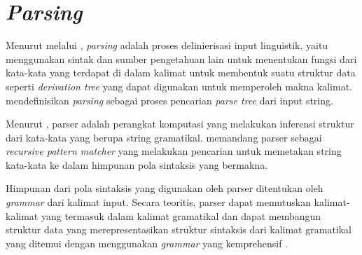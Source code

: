 \section{\emph{Parsing}}
Menurut \citet{bar_feigenbaum} melalui \citet{suryawan}, \emph{parsing} adalah proses delinierisasi input linguistik, yaitu menggunakan sintak dan sumber pengetahuan lain untuk menentukan fungsi dari kata-kata yang terdapat di dalam kalimat untuk membentuk suatu struktur data seperti \emph{derivation tree} yang dapat digunakan untuk memperoleh makna kalimat. \citep{russel_norvig} mendefinisikan \emph{parsing} sebagai proses pencarian \emph{parse tree} dari input string.

Menurut \citet{gazdar_mellish}, parser adalah perangkat komputasi yang melakukan inferensi struktur dari kata-kata yang berupa string gramatikal. \citet{bar_feigenbaum} memandang parser sebagai \emph{recursive pattern matcher} yang melakukan pencarian untuk memetakan string kata-kata ke dalam himpunan pola sintaksis yang bermakna.

Himpunan dari pola sintaksis yang digunakan oleh parser ditentukan oleh \emph{grammar} dari kalimat input. Secara teoritis, parser dapat memutuskan kalimat-kalimat yang termasuk dalam kalimat gramatikal dan dapat membangun struktur data yang merepresentasikan struktur sintaksis dari kalimat gramatikal yang ditemui dengan menggunakan \emph{grammar} yang kemprehensif \citep{bar_feigenbaum}.

